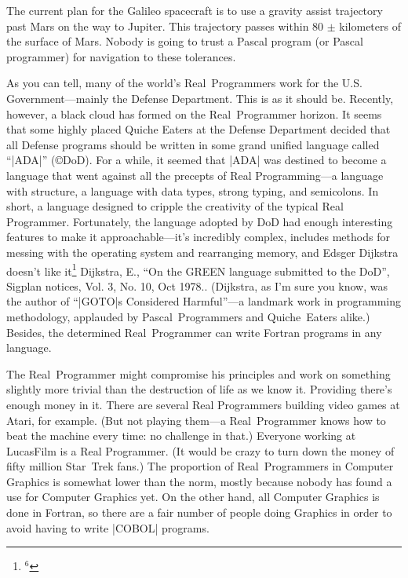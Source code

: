 The current plan for the Galileo spacecraft is to use a gravity assist
trajectory past Mars on the way to Jupiter. This trajectory passes
within 80 $\pm$ kilometers of the surface of Mars. Nobody is going to
trust a Pascal program (or Pascal programmer) for navigation to these
tolerances.

As you can tell, many of the world's Real~Programmers work for the
U.S. Government---mainly the Defense Department. This is as it should
be. Recently, however, a black cloud has formed on the Real~Programmer
horizon. It seems that some highly placed Quiche Eaters at the Defense
Department decided that all Defense programs should be written in some
grand unified language called ``|ADA|'' (\copyright DoD). For a while, it seemed
that |ADA| was destined to become a language that went against all the
precepts of Real Programming---a language with structure, a language
with data types, strong typing, and semicolons. In short, a language
designed to cripple the creativity of the typical Real
Programmer. Fortunately, the language adopted by DoD had enough
interesting features to make it approachable---it's incredibly
complex, includes methods for messing with the operating system and
rearranging memory, and Edsger Dijkstra doesn't like it\footnote{$^6$}{%
Dijkstra, E., ``On the GREEN language submitted to the DoD'', Sigplan notices, Vol. 3, No. 10, Oct 1978.}.
(Dijkstra, as I'm sure you know, was the author of ``|GOTO|s
Considered Harmful''---a landmark work in programming methodology,
applauded by Pascal~Programmers and Quiche~Eaters alike.) Besides, the
determined Real~Programmer can write Fortran programs in any language.

The Real~Programmer might compromise his principles and work on
something slightly more trivial than the destruction of life as we
know it. Providing there's enough money in it. There are several Real
Programmers building video games at Atari, for example. (But not
playing them---a Real~Programmer knows how to beat the machine every
time: no challenge in that.) Everyone working at LucasFilm is a Real
Programmer. (It would be crazy to turn down the money of fifty million
Star~Trek fans.) The proportion of Real~Programmers in Computer
Graphics is somewhat lower than the norm, mostly because nobody has
found a use for Computer Graphics yet. On the other hand, all Computer
Graphics is done in Fortran, so there are a fair number of people
doing Graphics in order to avoid having to write |COBOL| programs.

